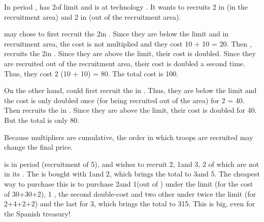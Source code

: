 \begin{exemple}
  In period , \POR has 2\LD of limit and is at technology \TMED. It
  wants to recruits 2 \LD in \provinceTejo (in the recruitment area) and 2 in
  \provinceTanger (out of the recruitment area).

  \POR may chose to first recruit the 2\LD in \provinceTejo. Since they are
  below the limit and in recruitment area, the cost is not multiplied and they
  cost 10 + 10 = 20\ducats. Then , \POR recruits the 2\LD in
  \provinceTanger. Since they are above the limit, their cost is
  doubled. Since they are recruited out of the recruitment area, their cost is
  doubled a second time. Thus, they cost 2  \textmultiply (10 +
  10) = 80\ducats. The total cost is 100\ducats.

  On the other hand, \POR could first recruit the \LD in
  \provinceTanger. Thus, they are below the limit and the cost is only doubled
  once (for being recruited out of the area) for 2  =
  40\ducats. Then \POR recruits the \LD in \provinceTejo. Since they are above
  the limit, their cost is doubled for 40\ducats. But the total is only
  80\ducats.

  Because multipliers are cumulative, the order in which troops are recruited
  may change the final price.
\end{exemple}

\begin{exemple}
  \HIS is \TARQ in period  (recruitment of 5\LD), and wishes to
  recruit 2\ARMY\facemoins, 1\ARMY\faceplus and 3\LD, 2 of which are not in
  its . The \ARMY\faceplus is bought with
  1\ARMY\facemoins and 2\LD, which brings the total to 3\ARMY\Facemoins and
  5\LD.  The cheapest way to purchase this is to purchase 2\ARMY and 1\LD (out
  of ) under the limit (for the cost of
  30+30+2), 1 \ARMY, the second double-cost \LD and two other
  \LD under twice the limit (for 2+4+2+2) and the last \LD for 3, which brings the total to 315\ducats. This is big, even for the Spanish
  treasury!
\end{exemple}

